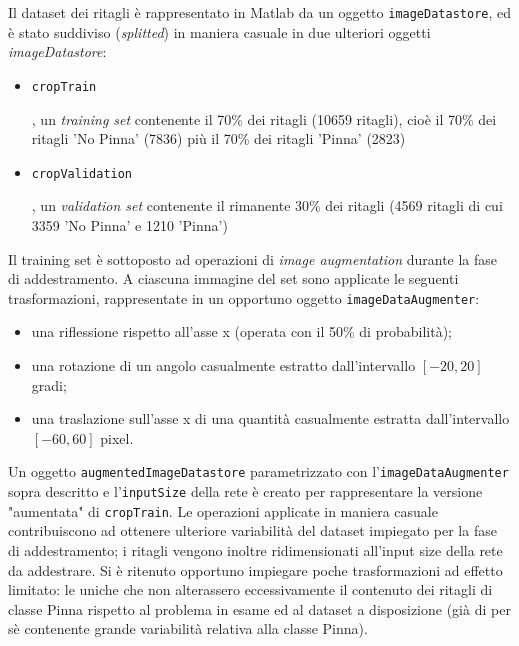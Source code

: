 Il dataset dei ritagli è rappresentato in Matlab da un oggetto \verb|imageDatastore|, ed è stato suddiviso (\textit{splitted}) in maniera casuale in due ulteriori oggetti \textit{imageDatastore}:

\begin{itemize}
\item \begin{frame}\space \verb|cropTrain|\end{frame}, un \textit{training set} contenente il 70\% dei ritagli (10659 ritagli), cioè il 70\% dei ritagli 'No Pinna' (7836) più il 70\% dei ritagli 'Pinna' (2823)
\item \begin{frame}\space \verb|cropValidation|\end{frame}, un \textit{validation set} contenente il rimanente 30\% dei ritagli (4569 ritagli di cui 3359 'No Pinna' e 1210 'Pinna')
\end{itemize}

Il training set è sottoposto ad operazioni di \textit{image augmentation} durante la fase di addestramento.
A ciascuna immagine del set sono applicate le seguenti trasformazioni, rappresentate in un opportuno oggetto \verb|imageDataAugmenter|:

\begin{itemize}
\item una riflessione rispetto all’asse x (operata con il 50\% di probabilità);
\item una rotazione di un angolo casualmente estratto dall’intervallo $[-20, 20]$ gradi;
\item una traslazione sull’asse x di una quantità casualmente estratta dall’intervallo
$[-60, 60]$ pixel.
\end{itemize}

Un oggetto \verb|augmentedImageDatastore| parametrizzato con l'\verb|imageDataAugmenter|  sopra descritto e l'\verb|inputSize| della rete è creato per rappresentare la versione "aumentata" di \verb|cropTrain|.
Le operazioni applicate in maniera casuale contribuiscono ad ottenere ulteriore variabilità del dataset impiegato per la fase di addestramento; i ritagli vengono inoltre ridimensionati all'input size della rete da addestrare. Si è ritenuto opportuno impiegare poche trasformazioni ad effetto limitato: le uniche che non alterassero eccessivamente il contenuto dei ritagli di classe Pinna rispetto al problema in esame ed al dataset a disposizione (già di per sè contenente grande variabilità relativa alla classe Pinna).

